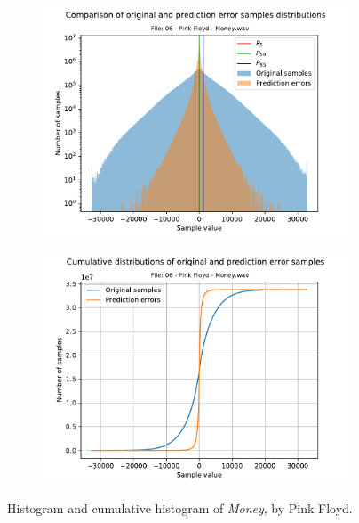\begin{figure}[h!]
	\centering
	\begin{subfigure}{0.45\textwidth}
		\centering
		\includegraphics[width=\linewidth]{images/wave_hists/06 - Pink Floyd - Money.wav_hist.pdf}
	\end{subfigure}%
	\begin{subfigure}{0.45\textwidth}
		\centering
		\includegraphics[width=\linewidth]{images/wave_hists/06 - Pink Floyd - Money.wav_hist_cum.pdf}
	\end{subfigure}
	\caption{Histogram and cumulative histogram of \textit{Money}, by Pink Floyd.}
	\label{fig:money_pink_floyd}
\end{figure}